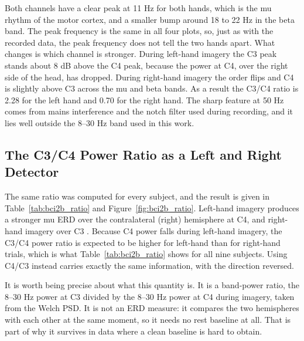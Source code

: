 \FloatBarrier

Both channels have a clear peak at 11 Hz for both hands, which is the mu rhythm of the
motor cortex, and a smaller bump around 18 to 22 Hz in the beta band. The peak frequency
is the same in all four plots, so, just as with the recorded data, the peak frequency does
not tell the two hands apart. What changes is which channel is stronger. During left-hand
imagery the C3 peak stands about 8 dB above the C4 peak, because the power at C4, over the
right side of the head, has dropped. During right-hand imagery the order flips and C4 is
slightly above C3 across the mu and beta bands. As a result the C3/C4 ratio is 2.28 for
the left hand and 0.70 for the right hand. The sharp feature at 50 Hz comes from mains
interference and the notch filter used during recording, and it lies well outside the
8--30 Hz band used in this work.

\subsection{The C3/C4 Power Ratio as a Left and Right Detector}

The same ratio was computed for every subject, and the result is given in
Table~\ref{tab:bci2b_ratio} and Figure~\ref{fig:bci2b_ratio}. Left-hand imagery produces a
stronger mu ERD over the contralateral (right) hemisphere at C4, and right-hand imagery
over C3 \cite{pfurtscheller2006mu, nam2011lateralization}. Because C4 power falls during
left-hand imagery, the C3/C4 power ratio is expected to be higher for left-hand than for
right-hand trials, which is what Table~\ref{tab:bci2b_ratio} shows for all nine subjects.
Using C4/C3 instead carries exactly the same information, with the direction reversed.

It is worth being precise about what this quantity is. It is a band-power ratio, the
8--30 Hz power at C3 divided by the 8--30 Hz power at C4 during imagery, taken from the
Welch PSD. It is not an ERD measure: it compares the two hemispheres with each other at
the same moment, so it needs no rest baseline at all. That is part of why it survives in
data where a clean baseline is hard to obtain.


